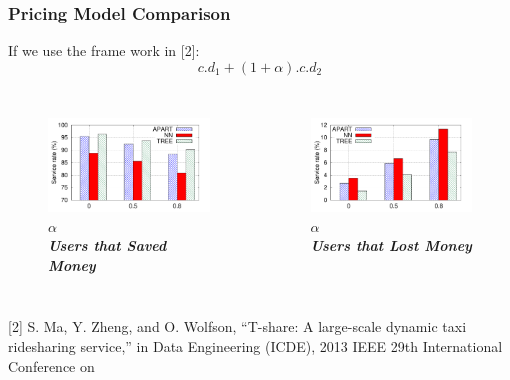 \documentclass[t]{beamer}
\begin{document}
\begin{frame}\frametitle{Pricing Model Comparison}
If we use the frame work in [2]:
\begin{equation*}
c.d_1 + (1+\alpha).c.d_2
\end{equation*}
\vspace{-0.3in}
\begin{columns}
\begin{figure}
	\centering
    \includegraphics[width = 0.95\columnwidth]{saved}
    \vspace{-0.1in}
    \small{$\alpha$}\\
    \small{\textbf{\textit{Users that Saved Money}}}
\end{figure}
\begin{figure}
	\centering
    \includegraphics[width = 0.95\columnwidth]{lost}
    \vspace{-0.1in}
    \small{$\alpha$}\\
    \small{\textbf{\textit{Users that Lost Money}}}
\end{figure}
\end{columns}
\vspace{0.4in}
\tiny{[2] S. Ma, Y. Zheng, and O. Wolfson, “T-share: A large-scale dynamic taxi ridesharing service,” in Data Engineering (ICDE), 2013 IEEE 29th International Conference on}
\end{frame}
\end{document}
